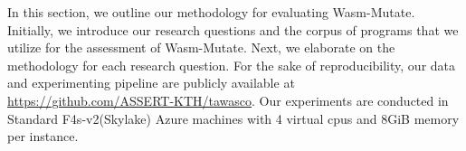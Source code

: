 \documentclass[a4paper,fleqn]{cas-dc}
\newcommand{\tool}{{\sc Wasm-Mutate}\xspace}
\newcommand{\Wasm}{WebAssembly\xspace}
\newcommand{\dataurl}{\url{https://github.com/ASSERT-KTH/tawasco}}
\begin{document}
In this section, we outline our methodology for evaluating \tool.
Initially, we introduce our research questions and the corpus of programs that we utilize for the assessment of \tool.
Next, we elaborate on the methodology for each research question.
For the sake of reproducibility, our data and experimenting pipeline are publicly available at \dataurl.
Our experiments are conducted in Standard F4s-v2(Skylake) Azure machines with 4 virtual cpus and 8GiB memory per instance.


\newcommand\rqstatic{To what extent are the program variants generated by \tool statically different from the original programs?\xspace}

\newcommand\rqdynamic{How fast can \tool generate program variants that exhibit different execution traces?\xspace}

\newcommand\rqdefensive{To what extent does \tool prevent side-channel attacks on \Wasm programs?\xspace}


\newcommand\rqperformance{To what extent does \tool affects the performance of real-world \Wasm program variants?\xspace}


\newcommand\rqtesting{To what extent can \tool be used to perform differential testing of \Wasm tools?\xspace}

\newcommand{\nProgramsRosetta}{303\xspace}


\newcommand{\DTWStatic}{\ensuremath{\mathit{dt\_static}\xspace}}
\newcommand{\DTWDynamic}{\ensuremath{\mathit{dt\_dy}\xspace}}
\end{document}
